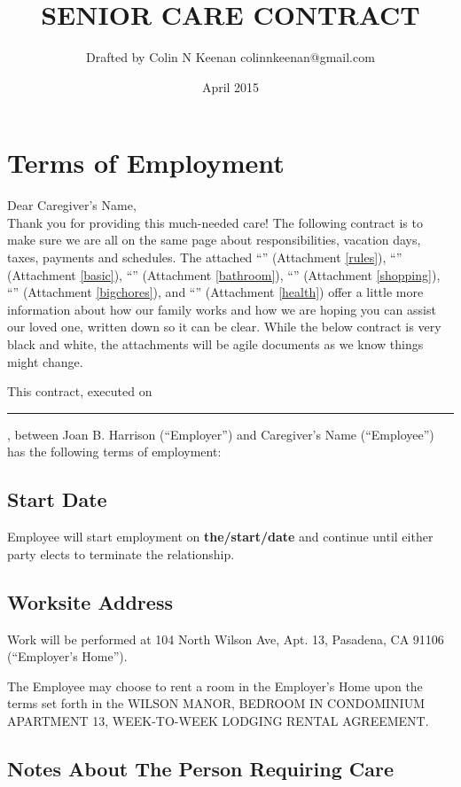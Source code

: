 \documentclass[]{article}
\newcommand{\mytitle}{SENIOR CARE CONTRACT}
\newcommand{\agreementtitle}{WILSON MANOR, BEDROOM IN CONDOMINIUM APARTMENT 13, WEEK-TO-WEEK LODGING RENTAL AGREEMENT}
\newcommand{\startdate}{the/start/date}
\newcommand{\datefillin}{\hspace{0.2cm}\rule{3cm}{.1pt}}
\newcommand{\lname}{Caregiver's Name}
\newcommand{\mom}{Joan B. Harrison}
\begin{document}
\title{\mytitle{}}
\author{Drafted by Colin N Keenan colinnkeenan@gmail.com}
\date{April 2015}
\maketitle
\thispagestyle{fancy}

\noindent \hrulefill
\section*{Terms of Employment}
Dear \lname{},\\

Thank you for providing this much-needed care! The following contract is to make sure we are all on the same page about responsibilities, vacation days, taxes, payments and schedules. The attached ``'' (Attachment \ref{rules}), ``\basic{}'' (Attachment \ref{basic}), ``\bathroom{}'' (Attachment \ref{bathroom}), ``\shopping{}'' (Attachment \ref{shopping}), ``\bigchores{}'' (Attachment \ref{bigchores}), and ``\health{}'' (Attachment \ref{health}) offer a little more information about how our family works and how we are hoping you can assist our loved one, written down so it can be clear. While the below contract is very black and white, the attachments will be agile documents as we know things might change.

This contract, executed on \datefillin{}, between \mom{} (``Employer'') and \lname{} (``Employee'') has the following terms of employment:

\subsection*{Start Date}

Employee will start employment on \textbf{\startdate{}} and continue until either party elects to terminate the relationship.

\subsection*{Worksite Address}

Work will be performed at 104 North Wilson Ave, Apt. 13, Pasadena, CA 91106 (``Employer's Home'').

The Employee may choose to rent a room in the Employer's Home upon the terms set forth in the \agreementtitle{}.

\subsection*{Notes About The Person Requiring Care}
\end{document}
